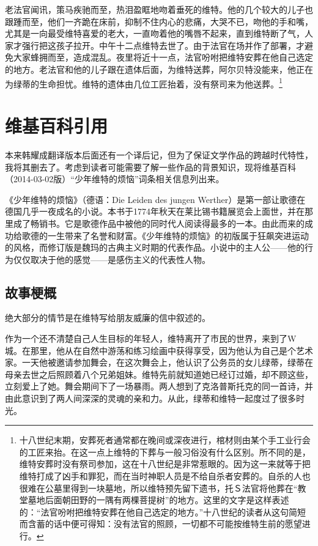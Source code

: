 \documentclass[12pt,oneside]{book}
\begin{document}
\begin{framed}
老法官闻讯，策马疾驰而至，热泪盈眶地吻着垂死的维特。他的几个较大的儿子也跟踵而至，他们一齐跪在床前，抑制不住内心的悲痛，大哭不已，吻他的手和嘴，尤其是一向最受维特喜爱的老大，一直吻着他的嘴唇不起来，直到维特断了气，人家才强行把这孩子拉开。中午十二点维特去世了。由于法官在场并作了部署，才避免大家蜂拥而至，造成混乱。夜里将近十一点，法官吩咐把维特安葬在他自己选定的地方。老法官和他的儿子跟在遗体后面，为维特送葬，阿尔贝特没能来，他正在为绿蒂的生命担忧。维特的遗体由几位工匠抬着，没有祭司来为他送葬。\footnote{十八世纪末期，安葬死者通常都在晚间或深夜进行，棺材则由某个手工业行会的工匠来抬。在这一点上维特的下葬与一般习俗没有什么区别。所不同的是，维特安葬时没有祭司参加，这在十八世纪是非常惹眼的。因为这一来就等于把维特打成了凶手和罪犯，而在当时神职人员是不给自杀者安葬的。自杀的人也很难在公墓里得到一块墓地，所以维特预先留下遗书，托Ｓ法官将他葬在“教堂墓地后面朝田野的一隅有两棵菩提树”的地方。这里的文字是这样表述的：“法官吩咐把维特安葬在他自己选定的地方。”十八世纪的读者从这句简短而含蓄的话中便可得知：没有法官的照顾，一切都不可能按维特生前的愿望进行。}
\end{framed}


\part{维基百科引用}
本来韩耀成翻译版本后面还有一个译后记，但为了保证文学作品的跨越时代特性，我将其删去了。考虑到读者可能需要了解一些作品的背景知识，现将维基百科（2014-03-02版）“少年维特的烦恼”词条相关信息列出来。

《少年维特的烦恼》（德语：Die Leiden des jungen Werther）是第一部让歌德在德国几乎一夜成名的小说。本书于1774年秋天在莱比锡书籍展览会上面世，并在那里成了畅销书。它是歌德作品中被他的同时代人阅读得最多的一本。由此而来的成功给歌德的一生带来了名誉和财富。《少年维特的烦恼》的初版属于狂飙突进运动的风格，而修订版是魏玛的古典主义时期的代表作品。小说中的主人公——他的行为仅仅取决于他的感觉——是感伤主义的代表性人物。

\chapter{故事梗概}
绝大部分的情节是在维特写给朋友威廉的信中叙述的。

作为一个还不清楚自己人生目标的年轻人，维特离开了市民的世界，来到了W城。在那里，他从在自然中游荡和练习绘画中获得享受，因为他认为自己是个艺术家。一天他被邀请参加舞会，在这次舞会上，他认识了公务员的女儿绿蒂，绿蒂在母亲去世之后照顾着八个兄弟姐妹。维特先前就知道她已经订过婚，却不顾这些，立刻爱上了她。舞会期间下了一场暴雨。两人想到了克洛普斯托克的同一首诗，并由此意识到了两人间深深的灵魂的亲和力。从此，绿蒂和维特一起度过了很多时光。
\end{document}
